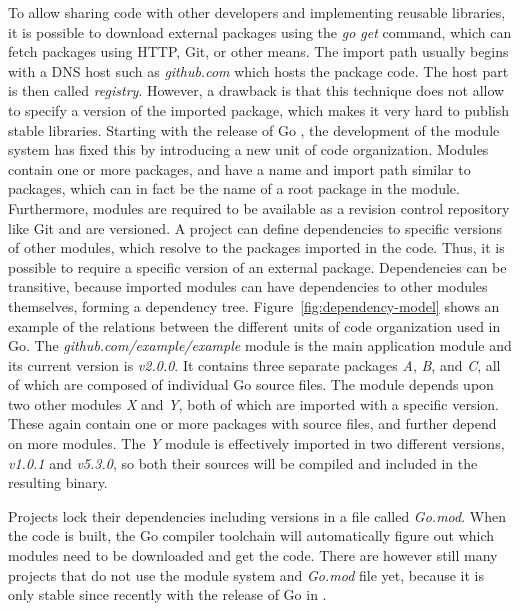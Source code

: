 To allow sharing code with other developers and implementing reusable libraries, it is possible to download external
packages using the \textit{go get} command, which can fetch packages using \acrshort{HTTP}, Git, or other means.
The import path usually begins with a \acrshort{DNS} host such as \textit{github.com} which hosts the package code.
The host part is then called \textit{registry}.
However, a drawback is that this technique does not allow to specify a version of the imported package, which makes it
very hard to publish stable libraries.
Starting with the release of Go , the development of the module system has fixed this by introducing a
new unit of code organization.
Modules contain one or more packages, and have a name and import path similar to packages, which can in fact be the name
of a root package in the module.
Furthermore, modules are required to be available as a revision control repository like Git and are versioned.
A project can define dependencies to specific versions of other modules, which resolve to the packages imported in the
code.
Thus, it is possible to require a specific version of an external package.
Dependencies can be transitive, because imported modules can have dependencies to other modules themselves,
forming a dependency tree.
Figure~\ref{fig:dependency-model} shows an example of the relations between the different units of code organization
used in Go.
The \textit{github.com/example/example} module is the main application module and its current version is
\textit{v2.0.0}.
It contains three separate packages \textit{A}, \textit{B}, and \textit{C}, all of which are composed of individual Go
source files.
The module depends upon two other modules \textit{X} and \textit{Y}, both of which are imported with a specific version.
These again contain one or more packages with source files, and further depend on more modules.
The \textit{Y} module is effectively imported in two different versions, \textit{v1.0.1} and \textit{v5.3.0}, so both
their sources will be compiled and included in the resulting binary.



Projects lock their dependencies including versions in a file called \textit{Go.mod}.
When the code is built, the Go compiler toolchain will automatically figure out which modules need to be downloaded and
get the code.
There are however still many projects that do not use the module system and \textit{Go.mod} file yet, because it is only
stable since recently with the release of Go  in .


